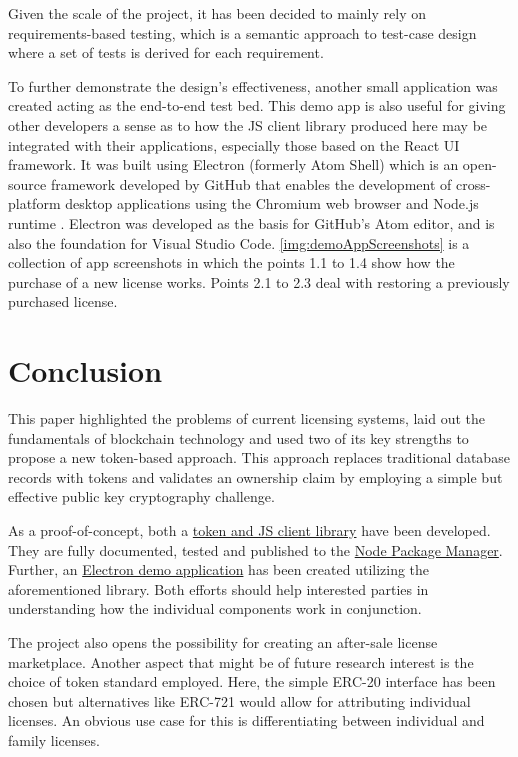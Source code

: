 \documentclass{egpubl}
\begin{document}
Given the scale of the project, it has been decided to mainly rely on requirements-based testing, which is a semantic approach to test-case design where a set of tests is derived for each requirement.

To further demonstrate the design's effectiveness, another small application was created acting as the end-to-end test bed. This demo app is also useful for giving other developers a sense as to how the JS client library produced here may be integrated with their applications, especially those based on the React UI framework. It was built using Electron (formerly Atom Shell) which is an open-source framework developed by GitHub that enables the development of cross-platform desktop applications using the Chromium web browser and Node.js runtime \cite{electron}. Electron was developed as the basis for GitHub's Atom editor, and is also the foundation for Visual Studio Code. \autoref{img:demoAppScreenshots} is a collection of app screenshots in which the points 1.1 to 1.4 show how the purchase of a new license works. Points 2.1 to 2.3 deal with restoring a previously purchased license.


\section{Conclusion}
This paper highlighted the problems of current licensing systems, laid out the fundamentals of blockchain technology and used two of its key strengths to propose a new token-based approach. This approach replaces traditional database records with tokens and validates an ownership claim by employing a simple but effective public key cryptography challenge.

As a proof-of-concept, both a \href{https://github.com/niksauer/serverless-software-license}{token and JS client library} have been developed. They are fully documented, tested and published to the \href{https://www.npmjs.com/package/serverless-software-license}{Node Package Manager}. Further, an \href{https://github.com/niksauer/serverless-software-license-example}{Electron demo application} has been created utilizing the aforementioned library. Both efforts should help interested parties in understanding how the individual components work in conjunction. 

The project also opens the possibility for creating an after-sale license marketplace. Another aspect that might be of future research interest is the choice of token standard employed. Here, the simple ERC-20 interface has been chosen but alternatives like ERC-721 would allow for attributing individual licenses. An obvious use case for this is differentiating between individual and family licenses.
\end{document}
